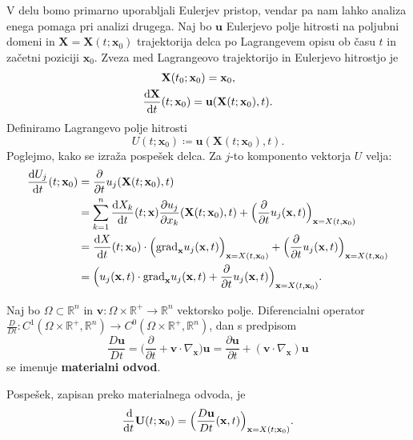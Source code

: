 \documentclass[mat2, tisk]{fmfdelo}
\newcommand{\R}{\mathbb R}
\newcommand{\bd}{\textbf}
\begin{document}
V delu bomo primarno uporabljali Eulerjev pristop, vendar pa nam lahko analiza enega pomaga
pri analizi drugega. Naj bo $\bd{u}$ Eulerjevo polje hitrosti na poljubni domeni in $\bd{X} = \bd{X}(t; \bd{x}_0)$ trajektorija delca 
po Lagrangevem opisu ob času $t$ in začetni poziciji $\bd{x}_0$. 
Zveza med Lagrangeovo trajektorijo in Eulerjevo hitrostjo je 
\begin{align}
&\bd{X}(t_0; \bd{x}_0) = \bd{x}_0, \\
\label{eq:euler-lagrange}
\frac{\dif \bd{X}}{\dif t}&(t; \bd{x}_0) = \bd{u}(\bd{X}(t; \bd{x}_0), t).
\end{align}
Definiramo Lagrangevo polje hitrosti
\begin{equation*}
U(t; \bd{x}_0) \coloneqq \bd{u}(\bd{X}(t; \bd{x}_0), t).
\end{equation*}
Poglejmo, kako se izraža pospešek delca. Za $j$-to komponento vektorja $U$ velja:
\begin{align*}
\frac{\dif U_j}{\dif t}(t; \bd{x}_0) &= \frac{\partial}{\partial t} u_j(\bd{X}(t; \bd{x}_0), t) \\
&= \sum_{k=1}^n \frac{\dif X_k}{\dif t}(t; \bd{x}) \frac{\partial u_j}{\partial x_k}(\bd{X}(t; \bd{x}_0), t) + \Big(\frac{\partial}{\partial t} u_j(\bd{x}, t) \Big)_{\bd{x} = X(t, \bd{x}_0)}\\
&= \frac{\dif X}{\dif t}(t; \bd{x}_0) \cdot \Big(\text{grad}_\bd{x} u_j(\bd{x}, t) \Big)_{\bd{x} = X(t, \bd{x}_0)} + \Big(\frac{\partial}{\partial t} u_j(\bd{x}, t) \Big)_{\bd{x} = X(t, \bd{x}_0)} \\
&= \Big(u_j(\bd{x}, t) \cdot \text{grad}_\bd{x} u_j(\bd{x}, t) + \frac{\partial}{\partial t} u_j(\bd{x}, t) \Big)_{\bd{x} = X(t, \bd{x}_0)}.
\end{align*}

\begin{definicija}
Naj bo $\Omega \subset \R^n$ in $\bd{v}: \Omega\times \R^+ \rightarrow \R^n$ vektorsko polje. Diferencialni operator 
$\frac{D}{D t}: C^1(\Omega \times \R^+, \R^n) \rightarrow C^0(\Omega \times \R^+, \R^n)$, dan s predpisom
\begin{equation*}
\frac{D \bd{u}}{Dt} = \Big(\frac{\partial}{\partial t} + \bd{v} \cdot \nabla_\bd{x}\Big) \bd{u} = \frac{\partial \bd{u}}{\partial t} + (\bd{v}\cdot \nabla_\bd{x}) \bd{u}
\end{equation*}
se imenuje \textbf{materialni odvod}.
\end{definicija}

Pospešek, zapisan preko materialnega odvoda, je 
\begin{equation*}
\frac{\dif}{\dif t} \bd{U}(t; \bd{x}_0) = \Big(\frac{D \bd{u}}{Dt}(\bd{x}, t) \Big)_{\bd{x} = X(t; \bd{x}_0)}.
\end{equation*}
\end{document}

